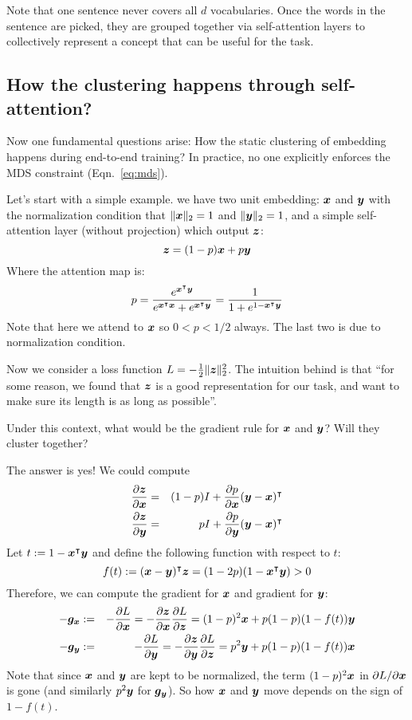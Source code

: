 Note that one sentence never covers all $d$ vocabularies. Once the words in the sentence are picked, they are grouped together via self-attention layers to collectively represent a concept that can be useful for the task. 

\subsection{How the clustering happens through self-attention?}
Now one fundamental questions arise: How the static clustering of embedding happens during end-to-end training? In practice, no one explicitly enforces the MDS constraint (Eqn.~\ref{eq:mds}). 

Let's start with a simple example. we have two unit embedding: ${\bm{x}}$ and ${\bm{y}}$ with the normalization condition that $\|{\bm{x}}\|_2 = 1$ and $\|{\bm{y}}\|_2 = 1$, and a simple self-attention layer (without projection) which output ${\bm{z}}$:
\begin{equation}
    {\bm{z}} = (1 - p){\bm{x}} + p {\bm{y}} 
\end{equation}
Where the attention map is:
\begin{equation}
    p = \frac{e^{{\bm{x}}^\intercal{\bm{y}}}}{e^{{\bm{x}}^\intercal{\bm{x}}} + e^{{\bm{x}}^\intercal{\bm{y}}}} = \frac{1}{1 + e^{1 - {\bm{x}}^\intercal{\bm{y}}}}
\end{equation}
Note that here we attend to ${\bm{x}}$ so $0 < p < 1/2$ always. The last two is due to normalization condition. 

Now we consider a loss function $L = -\frac{1}{2}\|{\bm{z}}\|_2^2$. The intuition behind is that ``for some reason, we found that ${\bm{z}}$ is a good representation for our task, and want to make sure its length is as long as possible''. 

Under this context, what would be the gradient rule for ${\bm{x}}$ and ${\bm{y}}$? Will they cluster together? 

The answer is yes! We could compute 
\begin{eqnarray}
    \frac{\partial {\bm{z}}}{\partial {\bm{x}}} &=& (1-p) I + \frac{\partial p}{\partial {\bm{x}}} ({\bm{y}} - {\bm{x}})^\intercal \\
    \frac{\partial {\bm{z}}}{\partial {\bm{y}}} &=& p I + \frac{\partial p}{\partial {\bm{y}}} ({\bm{y}} - {\bm{x}})^\intercal 
\end{eqnarray}
Let $t := 1 - {\bm{x}}^\intercal{\bm{y}}$ and define the following function with respect to $t$: 
\begin{equation}
    f(t) := ({\bm{x}}-{\bm{y}})^\intercal{\bm{z}} = (1-2p)(1 - {\bm{x}}^\intercal{\bm{y}}) > 0
\end{equation}
Therefore, we can compute the gradient for ${\bm{x}}$ and gradient for ${\bm{y}}$:
\begin{eqnarray}
    -{\bm{g}}_{\bm{x}} &:=& -\frac{\partial L}{\partial {\bm{x}}} = -\frac{\partial {\bm{z}}}{\partial {\bm{x}}} \frac{\partial L}{\partial {\bm{z}}} = (1 - p)^2{\bm{x}} + p(1-p)(1 - f(t)){\bm{y}} \\ 
    -{\bm{g}}_{\bm{y}} &:=& -\frac{\partial L}{\partial {\bm{y}}} = -\frac{\partial {\bm{z}}}{\partial {\bm{y}}} \frac{\partial L}{\partial {\bm{z}}} = p^2{\bm{y}} + p(1-p)(1 - f(t)){\bm{x}}  
\end{eqnarray}
Note that since ${\bm{x}}$ and ${\bm{y}}$ are kept to be normalized, the term $(1-p)^2{\bm{x}}$ in $\partial L / \partial {\bm{x}}$ is gone (and similarly $p^2{\bm{y}}$ for ${\bm{g}}_{\bm{y}}$). So how ${\bm{x}}$ and ${\bm{y}}$ move depends on the sign of $1 - f(t)$. 


